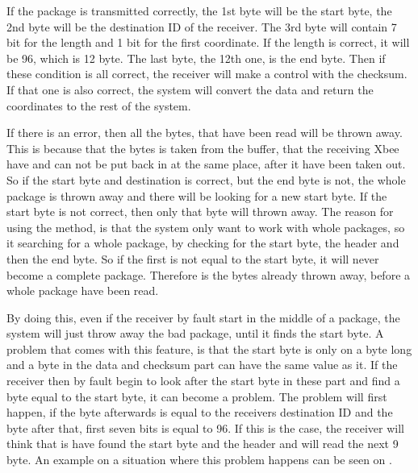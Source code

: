 If the package is transmitted correctly, the 1st byte will be the start byte, the 2nd byte will be the destination ID of the receiver. The 3rd byte will contain 7 bit for the length and 1 bit for the first coordinate. If the length is correct, it will be 96, which is 12 byte. The last byte, the 12th one, is the end byte. Then if these condition is all correct, the receiver will make a control with the checksum. If that one is also correct, the system will convert the data and return the coordinates to the rest of the system.

If there is an error, then all the bytes, that have been read will be thrown away. This is because that the bytes is taken from the buffer, that the receiving Xbee have and can not be put back in at the same place, after it have been taken out. So if the start byte and destination is correct, but the end byte is not, the whole package is thrown away and there will be looking for a new start byte. If the start byte is not correct, then only that byte will thrown away. The reason for using the method, is that the system only want to work with whole packages, so it searching for a whole package, by checking for the start byte, the header and then the end byte. So if the first is not equal to the start byte, it will never become a complete package. Therefore is the bytes already thrown away, before a whole package have been read.

By doing this, even if the receiver by fault start in the middle of a package, the system will just throw away the bad package, until it finds the start byte. A problem that comes with this feature, is that the start byte is only on a byte long and a byte in the data and checksum part can have the same value as it. If the receiver then by fault begin to look after the start byte in these part and find a byte equal to the start byte, it can become a problem. The problem will first happen, if the byte afterwards is equal to the receivers destination ID and the byte after that, first seven bits is equal to 96. If this is the case, the receiver will think that is have found the start byte and the header and will read the next 9 byte. An example on a situation where this problem happens can be seen on .

